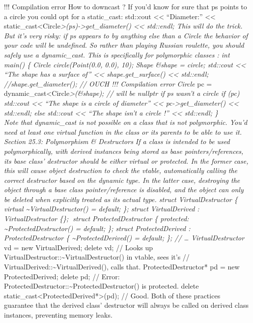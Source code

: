 !!! Compilation error How to downcast ? If you'd know for sure that ps
points to a circle you could opt for a static\_cast: std::cout
\textless\textless{} ``Diameter:'' \textless\textless{}
static\_cast\textless Circle\emph{\textgreater(ps)-\textgreater get\_diameter()
\textless\textless{} std::endl; This will do the trick. But it's very
risky: if ps appears to by anything else than a Circle the behavior of
your code will be undeﬁned. So rather than playing Russian roulette, you
should safely use a dynamic\_cast. This is speciﬁcally for polymorphic
classes : int main() \{ Circle circle(Point(0.0, 0.0), 10); Shape
\&shape = circle; std::cout \textless\textless{} ``The shape has a
surface of'' \textless\textless{} shape.get\_surface()
\textless\textless{} std::endl; //shape.get\_diameter(); // OUCH !!!
Compilation error Circle }pc =
dynamic\_cast\textless Circle\emph{\textgreater(\&shape); // will be
nullptr if ps wasn't a circle if (pc) std::cout \textless\textless{}
``The shape is a circle of diameter'' \textless\textless{}
pc-\textgreater get\_diameter() \textless\textless{} std::endl; else
std::cout \textless\textless{} ``The shape isn't a circle !''
\textless\textless{} std::endl; \}\\
Note that dynamic\_cast is not possible on a class that is not
polymorphic. You'd need at least one virtual function in the class or
its parents to be able to use it. Section 25.3: Polymorphism \&
Destructors If a class is intended to be used polymorphically, with
derived instances being stored as base pointers/references, its base
class' destructor should be either virtual or protected. In the former
case, this will cause object destruction to check the vtable,
automatically calling the correct destructor based on the dynamic type.
In the latter case, destroying the object through a base class
pointer/reference is disabled, and the object can only be deleted when
explicitly treated as its actual type. struct VirtualDestructor \{
virtual \textasciitilde VirtualDestructor() = default; \}; struct
VirtualDerived : VirtualDestructor \{\}; struct ProtectedDestructor \{
protected: \textasciitilde ProtectedDestructor() = default; \}; struct
ProtectedDerived : ProtectedDestructor \{
\textasciitilde ProtectedDerived() = default; \}; // \ldots{}
VirtualDestructor} vd = new VirtualDerived; delete vd; // Looks up
VirtualDestructor::\textasciitilde VirtualDestructor() in vtable, sees
it's // VirtualDerived::\textasciitilde VirtualDerived(), calls that.
ProtectedDestructor* pd = new ProtectedDerived; delete pd; // Error:
ProtectedDestructor::\textasciitilde ProtectedDestructor() is protected.
delete static\_cast\textless ProtectedDerived*\textgreater(pd); // Good.
Both of these practices guarantee that the derived class' destructor
will always be called on derived class instances, preventing memory
leaks.

